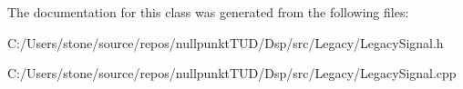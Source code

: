 The documentation for this class was generated from the following files\+:\begin{DoxyCompactItemize}
\item 
C\+:/\+Users/stone/source/repos/nullpunkt\+T\+U\+D/\+Dsp/src/\+Legacy/Legacy\+Signal.\+h\item 
C\+:/\+Users/stone/source/repos/nullpunkt\+T\+U\+D/\+Dsp/src/\+Legacy/Legacy\+Signal.\+cpp\end{DoxyCompactItemize}
